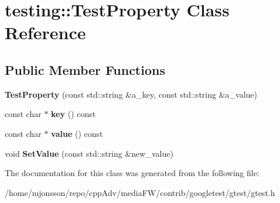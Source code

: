 \hypertarget{classtesting_1_1TestProperty}{}\section{testing\+:\+:Test\+Property Class Reference}
\label{classtesting_1_1TestProperty}
\subsection*{Public Member Functions}
\begin{DoxyCompactItemize}
\item 
\mbox{\label{classtesting_1_1TestProperty_a25a0ccf1c75a92af46a48d3c2a873e6d}} 
{\bfseries Test\+Property} (const std\+::string \&a\+\_\+key, const std\+::string \&a\+\_\+value)
\item 
\mbox{\label{classtesting_1_1TestProperty_ad60435d4ad04ac030487d8998fc61c5f}} 
const char $\ast$ {\bfseries key} () const
\item 
\mbox{\label{classtesting_1_1TestProperty_ad423a07af33c88b0c9ed33ee74815a63}} 
const char $\ast$ {\bfseries value} () const
\item 
\mbox{\label{classtesting_1_1TestProperty_a377245335d9f614cd06d1650e3358e1d}} 
void {\bfseries Set\+Value} (const std\+::string \&new\+\_\+value)
\end{DoxyCompactItemize}


The documentation for this class was generated from the following file\+:\begin{DoxyCompactItemize}
\item 
/home/mjonsson/repo/cpp\+Adv/media\+F\+W/contrib/googletest/gtest/gtest.\+h\end{DoxyCompactItemize}
